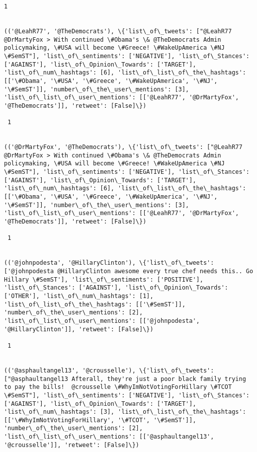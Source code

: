 \documentclass[11pt]{article}
\begin{document}
\begin{Verbatim}[commandchars=\\\{\}]
 1
 

(('@LeahR77', '@TheDemocrats'), \{'list\_of\_tweets': ["@LeahR77 @DrMartyFox > With continued \#Obama's \& @TheDemocrats Admin policymaking, \#USA will become \#Greece! \#WakeUpAmerica \#NJ \#SemST"], 'list\_of\_sentiments': ['NEGATIVE'], 'list\_of\_Stances': ['AGAINST'], 'list\_of\_Opinion\_Towards': ['TARGET'], 'list\_of\_num\_hashtags': [6], 'list\_of\_list\_of\_the\_hashtags': [['\#Obama', '\#USA', '\#Greece', '\#WakeUpAmerica', '\#NJ', '\#SemST']], 'number\_of\_the\_user\_mentions': [3], 'list\_of\_list\_of\_user\_mentions': [['@LeahR77', '@DrMartyFox', '@TheDemocrats']], 'retweet': [False]\})

 1
 

(('@DrMartyFox', '@TheDemocrats'), \{'list\_of\_tweets': ["@LeahR77 @DrMartyFox > With continued \#Obama's \& @TheDemocrats Admin policymaking, \#USA will become \#Greece! \#WakeUpAmerica \#NJ \#SemST"], 'list\_of\_sentiments': ['NEGATIVE'], 'list\_of\_Stances': ['AGAINST'], 'list\_of\_Opinion\_Towards': ['TARGET'], 'list\_of\_num\_hashtags': [6], 'list\_of\_list\_of\_the\_hashtags': [['\#Obama', '\#USA', '\#Greece', '\#WakeUpAmerica', '\#NJ', '\#SemST']], 'number\_of\_the\_user\_mentions': [3], 'list\_of\_list\_of\_user\_mentions': [['@LeahR77', '@DrMartyFox', '@TheDemocrats']], 'retweet': [False]\})

 1
 

(('@johnpodesta', '@HillaryClinton'), \{'list\_of\_tweets': ['@johnpodesta @HillaryClinton awesome every true chef needs this.. Go Hillary \#SemST'], 'list\_of\_sentiments': ['POSITIVE'], 'list\_of\_Stances': ['AGAINST'], 'list\_of\_Opinion\_Towards': ['OTHER'], 'list\_of\_num\_hashtags': [1], 'list\_of\_list\_of\_the\_hashtags': [['\#SemST']], 'number\_of\_the\_user\_mentions': [2], 'list\_of\_list\_of\_user\_mentions': [['@johnpodesta', '@HillaryClinton']], 'retweet': [False]\})

 1
 

(('@asphaultangel13', '@crousselle'), \{'list\_of\_tweets': ["@asphaultangel13 Afterall, they're just a poor black family trying to pay the bills!  @crousselle \#WhyImNotVotingForHillary \#TCOT \#SemST"], 'list\_of\_sentiments': ['NEGATIVE'], 'list\_of\_Stances': ['AGAINST'], 'list\_of\_Opinion\_Towards': ['TARGET'], 'list\_of\_num\_hashtags': [3], 'list\_of\_list\_of\_the\_hashtags': [['\#WhyImNotVotingForHillary', '\#TCOT', '\#SemST']], 'number\_of\_the\_user\_mentions': [2], 'list\_of\_list\_of\_user\_mentions': [['@asphaultangel13', '@crousselle']], 'retweet': [False]\})


\end{Verbatim}
\end{document}
